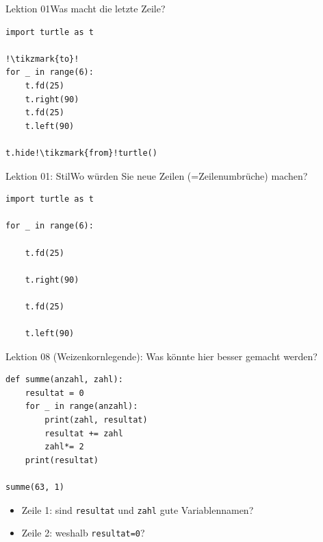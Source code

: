 \begin{frame}[fragile]{Lektion 01}{Was macht die letzte Zeile?}
\begin{lstlisting}
import turtle as t

!\tikzmark{to}!
for _ in range(6):
    t.fd(25)
    t.right(90)
    t.fd(25)
    t.left(90)

t.hide!\tikzmark{from}!turtle()
\end{lstlisting}


\end{frame}

\begin{frame}[fragile]{Lektion 01: Stil}{Wo würden Sie neue Zeilen (=Zeilenumbrüche) machen?}
\begin{lstlisting}
import turtle as t

for _ in range(6):

    t.fd(25)

    t.right(90)

    t.fd(25)

    t.left(90)

\end{lstlisting}

\end{frame}



\begin{frame}[fragile]{Lektion 08}
 (Weizenkornlegende): Was könnte hier besser gemacht werden?
\begin{lstlisting}
def summe(anzahl, zahl):
    resultat = 0
    for _ in range(anzahl):
        print(zahl, resultat)
        resultat += zahl
        zahl*= 2
    print(resultat)

summe(63, 1)
\end{lstlisting}
\begin{itemize}
    \item Zeile 1: sind \lstinline|resultat| und \lstinline|zahl| gute Variablennamen?
    \item Zeile 2: weshalb \lstinline|resultat=0|?
\end{itemize}
\end{frame}

